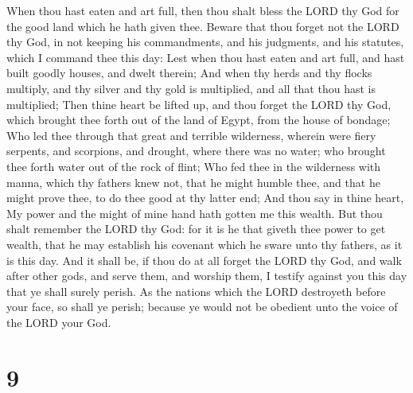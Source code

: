  When thou hast eaten and art full, then thou shalt bless
the LORD thy God for the good land which he hath given thee.
 Beware that thou forget not the LORD thy God, in not
keeping his commandments, and his judgments, and his statutes, which I
command thee this day:  Lest when thou hast eaten and art
full, and hast built goodly houses, and dwelt therein; 
And when thy herds and thy flocks multiply, and thy silver and thy gold
is multiplied, and all that thou hast is multiplied; 
Then thine heart be lifted up, and thou forget the LORD thy God, which
brought thee forth out of the land of Egypt, from the house of bondage;
 Who led thee through that great and terrible wilderness,
wherein were fiery serpents, and scorpions, and drought, where there was
no water; who brought thee forth water out of the rock of flint;
 Who fed thee in the wilderness with manna, which thy
fathers knew not, that he might humble thee, and that he might prove
thee, to do thee good at thy latter end;  And thou say in
thine heart, My power and the might of mine hand hath gotten me this
wealth.  But thou shalt remember the LORD thy God: for it
is he that giveth thee power to get wealth, that he may establish his
covenant which he sware unto thy fathers, as it is this day.
 And it shall be, if thou do at all forget the LORD thy
God, and walk after other gods, and serve them, and worship them, I
testify against you this day that ye shall surely perish.
 As the nations which the LORD destroyeth before your
face, so shall ye perish; because ye would not be obedient unto the
voice of the LORD your God.

\hypertarget{section-8}{%
\section{9}\label{section-8}}


